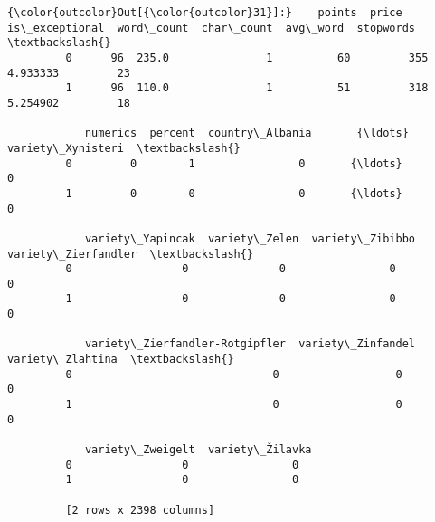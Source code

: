\documentclass[11pt]{article}
\begin{document}
\begin{Verbatim}[commandchars=\\\{\}]
{\color{outcolor}Out[{\color{outcolor}31}]:}    points  price  is\_exceptional  word\_count  char\_count  avg\_word  stopwords  \textbackslash{}
         0      96  235.0               1          60         355  4.933333         23   
         1      96  110.0               1          51         318  5.254902         18   
         
            numerics  percent  country\_Albania       {\ldots}         variety\_Xynisteri  \textbackslash{}
         0         0        1                0       {\ldots}                         0   
         1         0        0                0       {\ldots}                         0   
         
            variety\_Yapincak  variety\_Zelen  variety\_Zibibbo  variety\_Zierfandler  \textbackslash{}
         0                 0              0                0                    0   
         1                 0              0                0                    0   
         
            variety\_Zierfandler-Rotgipfler  variety\_Zinfandel  variety\_Zlahtina  \textbackslash{}
         0                               0                  0                 0   
         1                               0                  0                 0   
         
            variety\_Zweigelt  variety\_Žilavka  
         0                 0                0  
         1                 0                0  
         
         [2 rows x 2398 columns]
\end{Verbatim}
            
\end{document}
